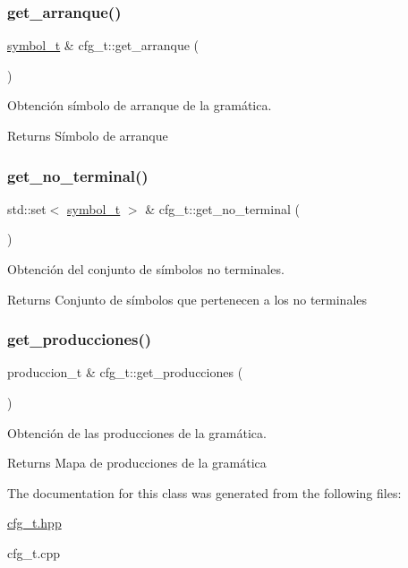 \subsubsection{\texorpdfstring{get\+\_\+arranque()}{get\_arranque()}}
{\footnotesize\ttfamily \hyperlink{classsymbol__t}{symbol\+\_\+t} \& cfg\+\_\+t\+::get\+\_\+arranque (\begin{DoxyParamCaption}{ }\end{DoxyParamCaption})}



Obtención símbolo de arranque de la gramática. 

\begin{DoxyReturn}{Returns}
Símbolo de arranque 
\end{DoxyReturn}
\mbox{\label{classcfg__t_a6ad5e12f79592554a1fd27a599e1b820}} 
\subsubsection{\texorpdfstring{get\+\_\+no\+\_\+terminal()}{get\_no\_terminal()}}
{\footnotesize\ttfamily std\+::set$<$ \hyperlink{classsymbol__t}{symbol\+\_\+t} $>$ \& cfg\+\_\+t\+::get\+\_\+no\+\_\+terminal (\begin{DoxyParamCaption}{ }\end{DoxyParamCaption})}



Obtención del conjunto de símbolos no terminales. 

\begin{DoxyReturn}{Returns}
Conjunto de símbolos que pertenecen a los no terminales 
\end{DoxyReturn}
\mbox{\label{classcfg__t_ab9208ef8e4ccc3ee5d9abf06720a4e28}} 
\subsubsection{\texorpdfstring{get\+\_\+producciones()}{get\_producciones()}}
{\footnotesize\ttfamily produccion\+\_\+t \& cfg\+\_\+t\+::get\+\_\+producciones (\begin{DoxyParamCaption}{ }\end{DoxyParamCaption})}



Obtención de las producciones de la gramática. 

\begin{DoxyReturn}{Returns}
Mapa de producciones de la gramática 
\end{DoxyReturn}


The documentation for this class was generated from the following files\+:\begin{DoxyCompactItemize}
\item 
\hyperlink{cfg__t_8hpp}{cfg\+\_\+t.\+hpp}\item 
cfg\+\_\+t.\+cpp\end{DoxyCompactItemize}
